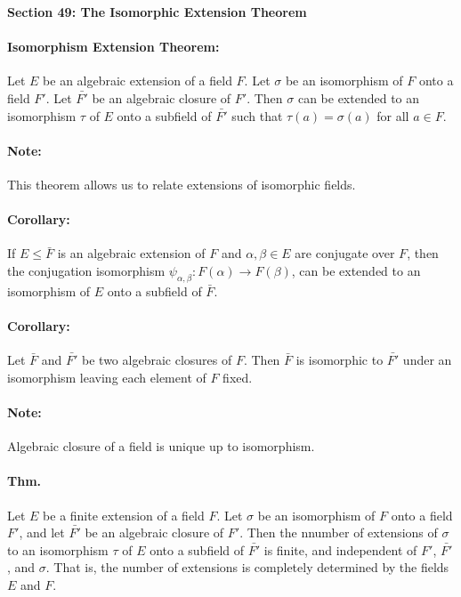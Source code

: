 \documentclass[10pt,a4paper]{article}
\begin{document}
\begin{center}
\textbf{Section 49: The Isomorphic Extension Theorem}
\end{center}

\paragraph{Isomorphism Extension Theorem:} Let $E$ be an algebraic extension of a field $F$. Let $\sigma$ be an isomorphism of $F$ onto a field $F'$. Let $\bar{F'}$ be an algebraic closure of $F'$. Then $\sigma$ can be extended to an isomorphism $\tau$ of $E$ onto a subfield of $\bar{F'}$ such that $\tau(a) = \sigma(a)$ for all $a \in F$.

\paragraph{Note:} This theorem allows us to relate extensions of isomorphic fields.

\paragraph{Corollary:} If $E \leq \bar{F}$ is an algebraic extension of $F$ and $\alpha,\beta \in E$ are conjugate over $F$, then the conjugation isomorphism $\psi_{\alpha,\beta}: F(\alpha) \to F(\beta)$, can be extended to an isomorphism of $E$ onto a subfield of $\bar{F}$.

\paragraph{Corollary:} Let $\bar{F}$ and $\bar{F'}$ be two algebraic closures of $F$. Then $\bar{F}$ is isomorphic to $\bar{F'}$ under an isomorphism leaving each element of $F$ fixed.

\paragraph{Note:} Algebraic closure of a field is unique up to isomorphism.

\paragraph{Thm.} Let $E$ be a finite extension of a field $F$. Let $\sigma$ be an isomorphism of $F$ onto a field $F'$, and let $\bar{F'}$ be an algebraic closure of $F'$. Then the nnumber of extensions of $\sigma$ to an isomorphism $\tau$ of $E$ onto a subfield of $\bar{F'}$ is finite, and independent of $F'$, $\bar{F'}$, and $\sigma$. That is, the number of extensions is completely determined by the fields $E$ and $F$.
\end{document}
